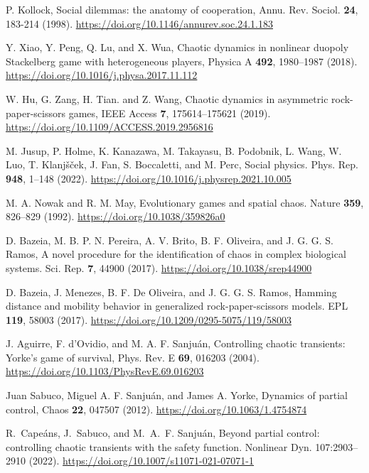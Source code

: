 \begin{thebibliography}{01}


P. Kollock, Social dilemmas: the anatomy of cooperation,
Annu. Rev. Sociol. \textbf{24}, 183-214 (1998).
\url{https://doi.org/10.1146/annurev.soc.24.1.183}


Y. Xiao, Y. Peng, Q. Lu, and X. Wua, Chaotic dynamics in nonlinear duopoly Stackelberg game with heterogeneous players,
Physica A \textbf{492}, 1980--1987 (2018).
\url{https://doi.org/10.1016/j.physa.2017.11.112}

W. Hu, G. Zang, H. Tian. and Z. Wang, Chaotic dynamics in asymmetric rock-paper-scissors games, IEEE Access \textbf{7}, 175614--175621 (2019).
\url{https://doi.org/10.1109/ACCESS.2019.2956816}

\raggedright
M. Jusup, P. Holme, K. Kanazawa,  M. Takayasu, B. Podobnik, L. Wang,  W. Luo, T. Klanjšček, J. Fan,  S. Boccaletti, and M. Perc,
Social physics.
Phys. Rep. \textbf{948}, 1--148 (2022). 
\url{https://doi.org/10.1016/j.physrep.2021.10.005}

\raggedright
M. A. Nowak and R. M. May,
Evolutionary games and spatial chaos. 
Nature \textbf{359}, 826--829 (1992).
\url{https://doi.org/10.1038/359826a0}



\raggedright
D. Bazeia, M. B. P. N. Pereira, A. V. Brito, B. F. Oliveira, and J. G. G. S. Ramos,
A novel procedure for the identification of chaos in complex biological systems.
Sci. Rep. \textbf{7}, 44900 (2017).
\url{https://doi.org/10.1038/srep44900}

\raggedright
D. Bazeia, J. Menezes, B. F. De Oliveira, and J. G. G. S. Ramos,
Hamming distance and mobility behavior in generalized rock-paper-scissors models.
EPL \textbf{119}, 58003 (2017).
\url{https://doi.org/10.1209/0295-5075/119/58003}


J. Aguirre, F. d’Ovidio, and M. A. F. Sanjuán,
Controlling chaotic transients: Yorke’s game of survival,
Phys. Rev. E \textbf{69}, 016203
(2004).
\url{https://doi.org/10.1103/PhysRevE.69.016203}

Juan Sabuco, Miguel A. F. Sanjuán,  and James A. Yorke,
Dynamics of partial control,
Chaos \textbf{22}, 047507
(2012).
\url{https://doi.org/10.1063/1.4754874}

R.~Cape{\'a}ns, J.~Sabuco, and M.~A.~F. Sanju{\'a}n, 
Beyond partial control: controlling chaotic transients
with the safety function.
Nonlinear Dyn. 107:2903–2910
(2022).
\url{https://doi.org/10.1007/s11071-021-07071-1}


\end{thebibliography}
